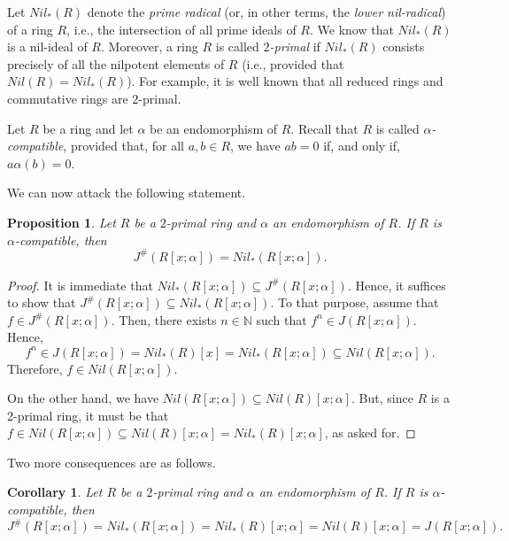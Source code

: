 \documentclass[12pt]{amsart}
\newtheorem{proposition}[theorem]{Proposition}
\newtheorem{corollary}[theorem]{Corollary}
\theoremstyle{definition}
\begin{document}
Let $Nil_*(R)$ denote the {\it prime radical} (or, in other terms, the {\it lower nil-radical}) of a ring $R$, i.e., the intersection of all prime ideals of $R$. We know that $Nil_*(R)$ is a nil-ideal of $R$. Moreover, a ring $R$ is called {\it $2$-primal} if $Nil_*(R)$ consists precisely of all the nilpotent elements of $R$ (i.e., provided that $Nil(R)=Nil_*(R)$). For example, it is well known that all reduced rings and commutative rings are $2$-primal.

\medskip

Let \( R \) be a ring and let \( \alpha \) be an endomorphism of \( R \). Recall that \( R \) is called \textit{\(\alpha\)-compatible}, provided that, for all \( a, b \in R \), we have $ab = 0$ if, and only if, $a\alpha(b) = 0$.

\medskip

We can now attack the following statement.

\begin{proposition}\label{2.10}
Let \( R \) be a \(2\)-primal ring and \( \alpha \) an endomorphism of \( R \). If \( R \) is \( \alpha \)-compatible, then
\[
	J^{\#}(R[x; \alpha]) = Nil_*(R[x; \alpha]).
\]
\end{proposition}

\begin{proof}
It is immediate that $Nil_*(R[x; \alpha])\subseteq J^{\#}(R[x; \alpha])$. Hence, it suffices to show that $J^{\#}(R[x; \alpha])\subseteq Nil_*(R[x; \alpha])$. To that purpose, assume that \( f \in J^{\#}( R[x; \alpha] ) \). Then, there exists \( n \in \mathbb{N} \) such that \( f^n \in J( R[x; \alpha] ) \). Hence, \[ f^n \in J(R[x; \alpha]) = Nil_*(R)[x] = Nil_*(R[x; \alpha]) \subseteq Nil(R[x; \alpha]).\] Therefore, \( f \in Nil(R[x; \alpha]) \).

On the other hand, we have $Nil(R[x; \alpha]) \subseteq Nil(R)[x; \alpha]$. But, since \(R\) is a 2-primal ring, it must be that \(f \in Nil(R[x; \alpha]) \subseteq Nil(R)[x; \alpha]=Nil_*(R)[x; \alpha]\), as asked for.
\end{proof}

Two more consequences are as follows.

\begin{corollary}\label{4.1}
Let \( R \) be a \(2\)-primal ring and \( \alpha \) an endomorphism of \( R \). If \( R \) is \( \alpha \)-compatible, then
\[
	J^{\#}(R[x; \alpha])=Nil_*(R[x; \alpha])=Nil_*(R)[x; \alpha]=Nil(R)[x; \alpha]=J(R[x; \alpha]).
\]
\end{corollary}
\end{document}
